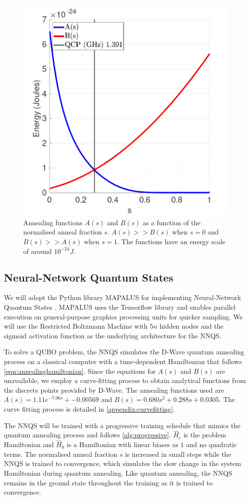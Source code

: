\begin{figure}[h!]
    \centering
    \includegraphics[width=0.5\linewidth]{images/dwave_annealing.png}
    \caption[Annealing functions $A(s)$ and $B(s)$ as a function of the normalised anneal fraction $s$. $A(s) >> B(s)$ when $s=0$ and $B(s) >> A(s)$ when $s=1$. The functions have an energy scale of around $10^{-24} J$.]{Annealing functions $A(s)$ and $B(s)$ as a function of the normalised anneal fraction $s$. $A(s) >> B(s)$ when $s=0$ and $B(s) >> A(s)$ when $s=1$. The functions have an energy scale of around $10^{-24} J$. ~\protect\cite{dwaveadvantage}}
    \label{dwaveannealing}
\end{figure}

\subsection{Neural-Network Quantum States}
We will adopt the Python library MAPALUS for implementing Neural-Network Quantum States \cite{b25}. MAPALUS uses the Tensorflow library and enables parallel execution on general-purpose graphics processing units for quicker sampling. We will use the Restricted Boltzmann Machine with $5n$ hidden nodes and the sigmoid activation function as the underlying architecture for the NNQS.

To solve a QUBO problem, the NNQS simulates the D-Wave quantum annealing process on a classical computer with a time-dependent Hamiltonian that follows \autoref{eqn:annealinghamiltonian}. Since the equations for $A(s)$ and $B(s)$ are unavailable, we employ a curve-fitting process to obtain analytical functions from the discrete points provided by D-Wave. The annealing functions used are $A(s) = 1.11e^{-7.06s} + -0.00569$ and $B(s)= 0.680s^2 + 0.288s + 0.0305$. The curve fitting process is detailed in \autoref{appendix:curvefitting}.

The NNQS will be trained with a progressive training schedule that mimics the quantum annealing process and follows \autoref{alg:progressive}. $\hat{H}_c$ is the problem Hamiltonian and $\hat{H}_0$ is a Hamiltonian with linear biases as $1$ and no quadratic terms. The normalised anneal fraction $s$ is increased in small steps while the NNQS is trained to convergence, which simulates the slow change in the system Hamiltonian during quantum annealing. Like quantum annealing, the NNQS remains in the ground state throughout the training as it is trained to convergence.


